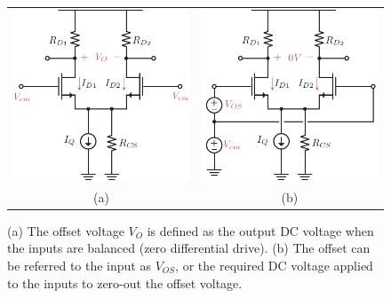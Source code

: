 \begin{figure}[tb]
\begin{center}
\begin{tabular}{cc}
\includegraphics[scale=1]{Diffamp_offset.pdf} &
\includegraphics[scale=1]{Diffamp_offset_input.pdf} \\
(a) & (b) \\
\end{tabular}
\end{center}
\caption{(a) The offset voltage $V_O$ is defined as the output DC voltage when the inputs are balanced (zero differential drive).  (b) The offset can be referred to the input as $V_{OS}$, or the required DC voltage applied to the inputs to zero-out the offset voltage.} \label{fig:Diffamp_offset.pdf}
\end{figure}


